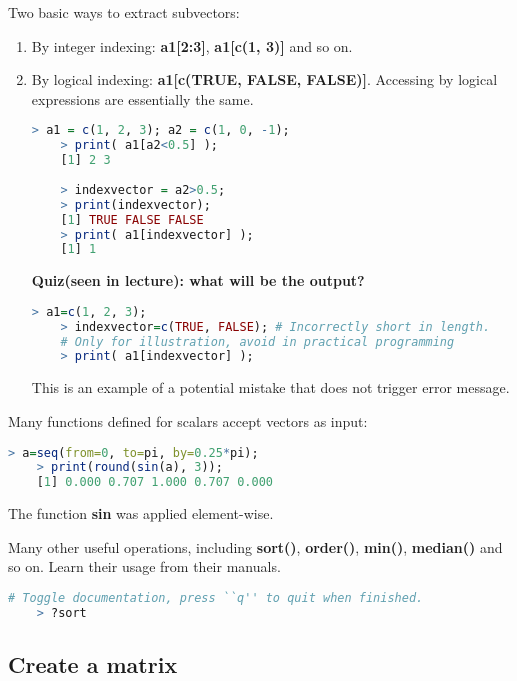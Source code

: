 \documentclass[10pt]{article}
\begin{document}
Two basic ways to extract subvectors:
\begin{enumerate}
	\item By integer indexing: {\bf a1[2:3]}, {\bf a1[c(1, 3)]} and so on.
	\item By logical indexing: {\bf a1[c(TRUE, FALSE, FALSE)]}. Accessing by logical expressions are essentially the same.
\begin{lstlisting}[style=displaycode, language=R]
	> a1 = c(1, 2, 3); a2 = c(1, 0, -1);
	> print( a1[a2<0.5] );
	[1] 2 3
	
	> indexvector = a2>0.5;
	> print(indexvector);
	[1] TRUE FALSE FALSE
	> print( a1[indexvector] );
	[1] 1
\end{lstlisting}

{\bf Quiz(seen in lecture): what will be the output?}
\begin{lstlisting}[style=displaycode, language=R]
	> a1=c(1, 2, 3);
	> indexvector=c(TRUE, FALSE); # Incorrectly short in length.
	# Only for illustration, avoid in practical programming
	> print( a1[indexvector] );
\end{lstlisting}
This is an example of a potential mistake that does not trigger error message.

\end{enumerate}

Many functions defined for scalars accept vectors as input:
\begin{lstlisting}[style=displaycode, language=R]
	> a=seq(from=0, to=pi, by=0.25*pi);
	> print(round(sin(a), 3));
	[1] 0.000 0.707 1.000 0.707 0.000
\end{lstlisting}
The function {\bf sin} was applied element-wise.

Many other useful operations, including {\bf sort()}, {\bf order()}, {\bf min()}, {\bf median()} and so on. Learn their usage from their manuals.
\begin{lstlisting}[style=displaycode, language=R]
	# Toggle documentation, press ``q'' to quit when finished.
	> ?sort
\end{lstlisting}

\subsection{Create a matrix}
\end{document}
